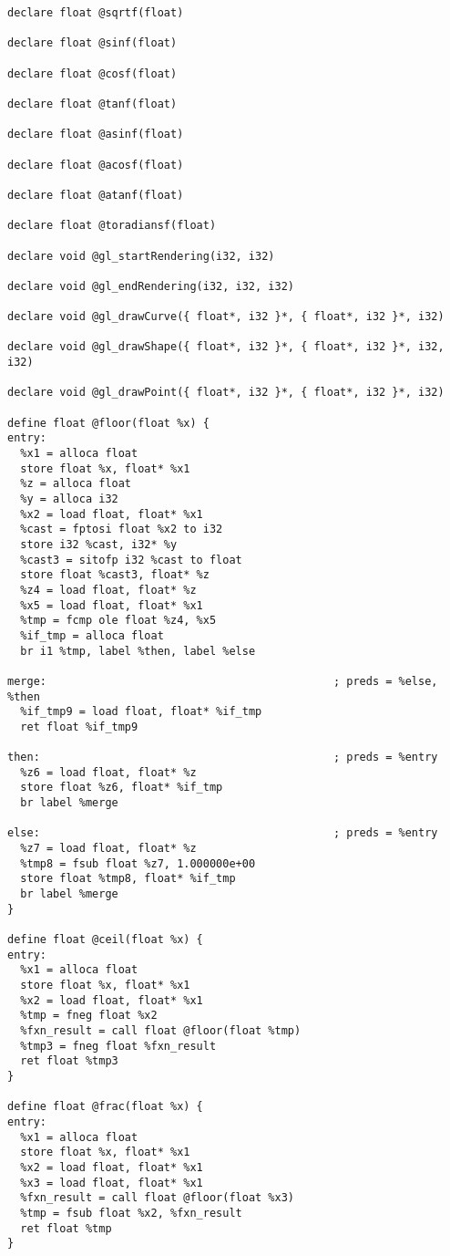 \documentclass[main.tex]{subfiles}
\begin{document}
{\begin{lstlisting}
declare float @sqrtf(float)

declare float @sinf(float)

declare float @cosf(float)

declare float @tanf(float)

declare float @asinf(float)

declare float @acosf(float)

declare float @atanf(float)

declare float @toradiansf(float)

declare void @gl_startRendering(i32, i32)

declare void @gl_endRendering(i32, i32, i32)

declare void @gl_drawCurve({ float*, i32 }*, { float*, i32 }*, i32)

declare void @gl_drawShape({ float*, i32 }*, { float*, i32 }*, i32, i32)

declare void @gl_drawPoint({ float*, i32 }*, { float*, i32 }*, i32)

define float @floor(float %x) {
entry:
  %x1 = alloca float
  store float %x, float* %x1
  %z = alloca float
  %y = alloca i32
  %x2 = load float, float* %x1
  %cast = fptosi float %x2 to i32
  store i32 %cast, i32* %y
  %cast3 = sitofp i32 %cast to float
  store float %cast3, float* %z
  %z4 = load float, float* %z
  %x5 = load float, float* %x1
  %tmp = fcmp ole float %z4, %x5
  %if_tmp = alloca float
  br i1 %tmp, label %then, label %else

merge:                                            ; preds = %else, %then
  %if_tmp9 = load float, float* %if_tmp
  ret float %if_tmp9

then:                                             ; preds = %entry
  %z6 = load float, float* %z
  store float %z6, float* %if_tmp
  br label %merge

else:                                             ; preds = %entry
  %z7 = load float, float* %z
  %tmp8 = fsub float %z7, 1.000000e+00
  store float %tmp8, float* %if_tmp
  br label %merge
}

define float @ceil(float %x) {
entry:
  %x1 = alloca float
  store float %x, float* %x1
  %x2 = load float, float* %x1
  %tmp = fneg float %x2
  %fxn_result = call float @floor(float %tmp)
  %tmp3 = fneg float %fxn_result
  ret float %tmp3
}

define float @frac(float %x) {
entry:
  %x1 = alloca float
  store float %x, float* %x1
  %x2 = load float, float* %x1
  %x3 = load float, float* %x1
  %fxn_result = call float @floor(float %x3)
  %tmp = fsub float %x2, %fxn_result
  ret float %tmp
}


\end{lstlisting}}
\end{document}

